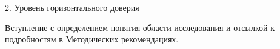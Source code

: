 \begin{frame}{2. Уровень горизонтального доверия}

Вступление с определением понятия области исследования и отсылкой к подробностям в Методических рекомендациях.

\end{frame}


